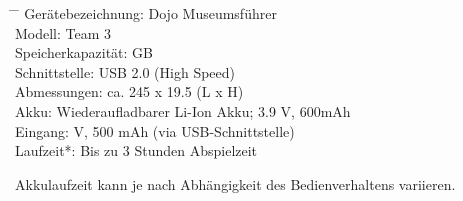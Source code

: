\begin{tabbing}
\hspace{40mm}		\= \hspace{15mm} \=\kill
Gerätebezeichnung:	\> Dojo Museumsführer \\[4mm]
Modell:				\> Team 3 \\[4mm]
Speicherkapazität:	 GB \\[4mm]
Schnittstelle:		\> USB 2.0 (High Speed) \\[4mm]
Abmessungen:		\> ca. 245 x 19.5 (L x H) \\[4mm]
Akku:				\> Wiederaufladbarer Li-Ion Akku; 3.9 V, 600mAh \\[4mm]
Eingang:			 V, 500 mAh (via USB-Schnittstelle) \\[4mm]
Laufzeit*:			\> Bis zu 3 Stunden Abspielzeit \\[4mm]
\end{tabbing}

\begin{description}
\item *Akkulaufzeit kann je nach Abhängigkeit des Bedienverhaltens variieren.
\end{description}


